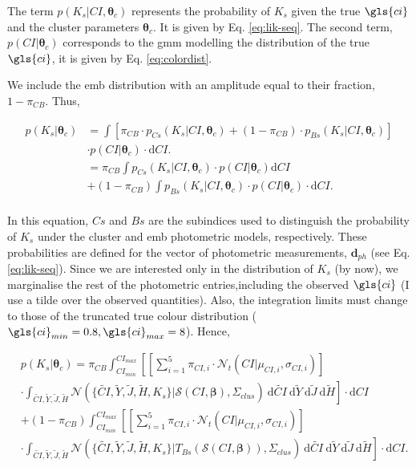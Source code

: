 The term $p(K_s | CI ,\boldsymbol{\theta}_c)$ represents the probability of $K_s$ given the true $\gls{ci}$ and the cluster parameters $\boldsymbol{\theta}_c$. It is given by Eq. \ref{eq:lik-seq}. The second term, $p(CI|\boldsymbol{\theta}_c)$ corresponds to the \gls{gmm} modelling the distribution of the true $\gls{ci}$, it is given by Eq. \ref{eq:colordist}. 

We include the \gls{emb}  distribution with an amplitude equal to their fraction, $1-\pi_{CB}$. Thus,

\begin{align}
p(K_s | \boldsymbol{\theta}_c) & =  \int \left[\pi_{CB}\cdot p_{Cs}(K_s| CI, \boldsymbol{\theta}_c) + (1-\pi_{CB})\cdot p_{Bs}(K_s| CI, \boldsymbol{\theta}_c)\right]\nonumber \\& \cdot p(CI|\boldsymbol{\theta}_c)\cdot \mathrm{d}CI. \nonumber \\
& =   \pi_{CB} \int p_{Cs}(K_s| CI, \boldsymbol{\theta}_c) \cdot p(CI|\boldsymbol{\theta}_c) \mathrm{d}CI \nonumber \\
&+ (1-\pi_{CB})\int p_{Bs}(K_s| CI, \boldsymbol{\theta}_c) \cdot p(CI|\boldsymbol{\theta}_c)\cdot  \mathrm{d}CI. \nonumber \\
\end{align}

In this equation, $Cs$ and $Bs$ are the subindices used to distinguish the probability of $K_s$ under the cluster and \gls{emb} photometric models, respectively. These probabilities are defined for the vector of photometric measurements, $\boldsymbol{d}_{ph}$ (see Eq. \ref{eq:lik-seq}). Since we are interested only in the distribution of $K_s$ (by now), we marginalise the rest of the photometric entries,including the observed $\gls{ci}$ (I use a tilde over the observed quantities). Also, the integration limits must change to those of the truncated true colour distribution ($\gls{ci}_{min}=0.8, \gls{ci}_{max}=8$). Hence,

\begin{align}
&p(K_s | \boldsymbol{\theta}_c)  =   \pi_{CB} \int_{CI_{min}}^{CI_{max}}\left[ \left[\sum_{i=1}^5 \pi_{CI,i} \cdot \mathcal{N}_t(CI| \mu_{CI,i},\sigma_{CI,i})\right]\right. \nonumber \\
&\cdot  \left.\int_{\tilde{CI},\tilde{Y},\tilde{J},\tilde{H}}\mathcal{N}(\{\tilde{CI},\tilde{Y},\tilde{J},\tilde{H},K_s\}|\boldsymbol{\mathcal{S}}(CI, \boldsymbol{\beta}),\Sigma_{clus})~\mathrm{d}\tilde{CI}~\mathrm{d}\tilde{Y}~\mathrm{d}\tilde{J}~\mathrm{d}\tilde{H}\right] \cdot \mathrm{d}CI \nonumber \\
& + (1-\pi_{CB}) \int_{CI_{min}}^{CI_{max}}\left[\left[\sum_{i=1}^5 \pi_{CI,i} \cdot \mathcal{N}_t(CI| \mu_{CI,i},\sigma_{CI,i})\right]\right.\nonumber\\
&\cdot \left. \int_{\tilde{CI},\tilde{Y},\tilde{J},\tilde{H}}\mathcal{N}(\{\tilde{CI},\tilde{Y},\tilde{J},\tilde{H},K_s\}|T_{Bs}(\boldsymbol{\mathcal{S}}(CI, \boldsymbol{\beta})),\Sigma_{clus})~\mathrm{d}\tilde{CI}~\mathrm{d}\tilde{Y}~\mathrm{d}\tilde{J}~\mathrm{d}\tilde{H}\right]\cdot \mathrm{d}CI. \nonumber 
\end{align}

